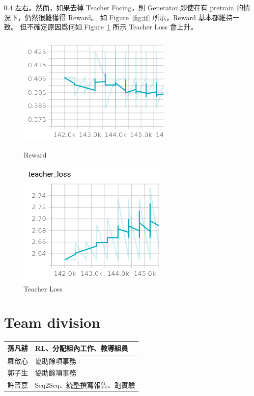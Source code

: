 \documentclass[12pt, a4paper]{article}
\theoremstyle{mystyle}	%
\begin{document}
\begin{enumerate}
  0.4 左右。然而，如果去掉 Teacher Focing，則 Generator
  即使在有 pretrain 的情況下，仍然很難獲得 Reward。
  如 Figure~\ref{fig:tf} 所示，Reward 基本都維持一致。
  但不確定原因爲何如 Figure~\ref{fig:tl} 所示 Teacher Loss
  會上升。
  \begin{figure}[!htb]
    \centering
    \includegraphics[scale=0.5]{tf.png}
    \caption{Reward}
    \label{fig:tf}
   \endminipage
   \hfill
    \centering
    \includegraphics[scale=0.5]{tl.png}
    \caption{Teacher Loss}
    \label{fig:tl}
   \endminipage
  \end{figure}
\end{enumerate}

\section{Team division}
\begin{table}[h]
\centering
\begin{tabular}{ |C{2cm}|C{10cm}| }
  \hline
  孫凡耕 & RL、分配組內工作、教導組員\\
  \hline
  羅啟心 & 協助餘項事務\\
  \hline
  郭子生 & 協助餘項事務 \\
  \hline
  許晉嘉 & Seq2Seq、統整撰寫報告、跑實驗 \\
  \hline
\end{tabular}
\end{table}
\end{document}

